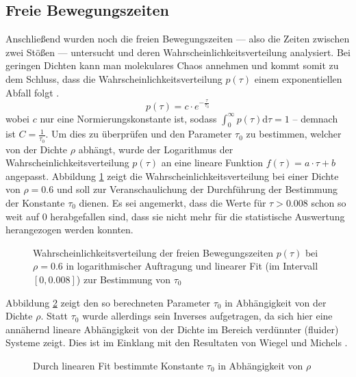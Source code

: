 \subsection{Freie Bewegungszeiten}
Anschließend wurden noch die freien Bewegungszeiten --- also die Zeiten zwischen zwei Stößen --- untersucht und deren Wahrscheinlichkeitsverteilung analysiert. Bei geringen Dichten kann man molekulares Chaos annehmen und kommt somit zu dem Schluss, dass die Wahrscheinlichkeitsverteilung $p(\tau)$ einem exponentiellen Abfall folgt \cite{Wiegel1976}.
\begin{equation}
p(\tau) = c\cdot e^{-\frac{\tau}{\tau_0}}
\end{equation} 
wobei $c$ nur eine Normierungskonstante ist, sodass $\int_0^{\infty} p(\tau) \text{d}\tau = 1$ -- demnach ist $C = \frac{1}{\tau_0}$. Um dies zu überprüfen und den Parameter $\tau_0$ zu bestimmen, welcher von der Dichte $\rho$ abhängt, wurde der Logarithmus der Wahrscheinlichkeitsverteilung $p(\tau)$ an eine lineare Funktion $f(\tau) = a\cdot \tau + b$ angepasst. Abbildung \ref{fig:collisionfit} zeigt die Wahrscheinlichkeitsverteilung bei einer Dichte von $\rho = 0.6$ und soll zur Veranschaulichung der Durchführung der Bestimmung der Konstante $\tau_0$ dienen. Es sei angemerkt, dass die Werte für $\tau > 0.008$ schon so weit auf 0 herabgefallen sind, dass sie nicht mehr für die statistische Auswertung herangezogen werden konnten. 

\begin{figure}[H]
 \centering
  \resizebox{0.9\textwidth}{!}{}
 \caption{Wahrscheinlichkeitsverteilung der freien Bewegungszeiten $p(\tau)$ bei $\rho = 0.6$ in logarithmischer Auftragung und linearer Fit (im Intervall $[0,0.008]$) zur Bestimmung von $\tau_0$}
 \label{fig:collisionfit}
\end{figure} 
Abbildung \ref{fig:flight} zeigt den so berechneten Parameter $\tau_0$ in Abhängigkeit von der Dichte $\rho$. Statt $\tau_0$ wurde allerdings sein Inverses aufgetragen, da sich hier eine annähernd lineare Abhängigkeit von der Dichte im Bereich verdünnter (fluider) Systeme zeigt. Dies ist im Einklang mit den Resultaten von Wiegel und Michels \cite{Wiegel1979}. 

\begin{figure}[H]
 \centering
  \resizebox{0.9\textwidth}{!}{}
 \caption{Durch linearen Fit bestimmte Konstante $\tau_0$ in Abhängigkeit von $\rho$}
 \label{fig:flight}
\end{figure} 